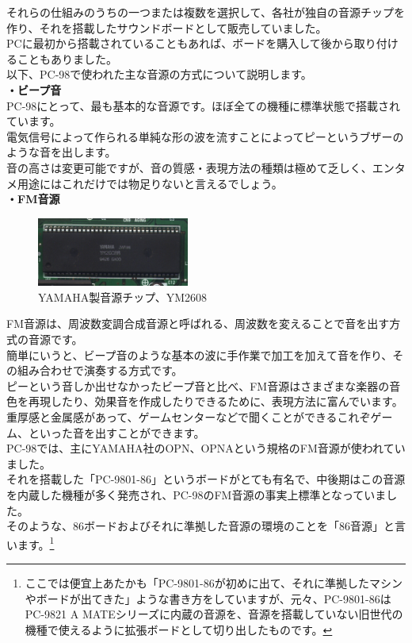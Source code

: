 \documentclass[b5paper,9pt,platex,dvipdfmx]{jsarticle}
\begin{document}
\begin{multicols}{3}
\begin{enumerate}
  それらの仕組みのうちの一つまたは複数を選択して、各社が独自の音源チップを作り、それを搭載したサウンドボードとして販売していました。\\
  PCに最初から搭載されていることもあれば、ボードを購入して後から取り付けることもありました。\\
  以下、PC-98で使われた主な音源の方式について説明します。\\
  {\bf ・ビープ音\\}
  PC-98にとって、最も基本的な音源です。ほぼ全ての機種に標準状態で搭載されています。\\
  電気信号によって作られる単純な形の波を流すことによってピーというブザーのような音を出します。\\
  音の高さは変更可能ですが、音の質感・表現方法の種類は極めて乏しく、エンタメ用途にはこれだけでは物足りないと言えるでしょう。\\
  {\bf ・FM音源 \\}
  \begin{figure}[H]
    \centering
    \includegraphics[width=5cm]{img-4.jpg}
    \caption{YAMAHA製音源チップ、YM2608}
  \end{figure}
  FM音源は、周波数変調合成音源と呼ばれる、周波数を変えることで音を出す方式の音源です。\\
  簡単にいうと、ビープ音のような基本の波に手作業で加工を加えて音を作り、その組み合わせで演奏する方式です。\\
  ピーという音しか出せなかったビープ音と比べ、FM音源はさまざまな楽器の音色を再現したり、効果音を作成したりできるために、表現方法に富んでいます。\\
  重厚感と金属感があって、ゲームセンターなどで聞くことができるこれぞゲーム、といった音を出すことができます。\\
  PC-98では、主にYAMAHA社のOPN、OPNAという規格のFM音源が使われていました。\\
  それを搭載した「PC-9801-86」というボードがとても有名で、中後期はこの音源を内蔵した機種が多く発売され、PC-98のFM音源の事実上標準となっていました。\\
  そのような、86ボードおよびそれに準拠した音源の環境のことを「86音源」と言います。\footnote{ここでは便宜上あたかも「PC-9801-86が初めに出て、それに準拠したマシンやボードが出てきた」ような書き方をしていますが、元々、PC-9801-86はPC-9821 A MATEシリーズに内蔵の音源を、音源を搭載していない旧世代の機種で使えるように拡張ボードとして切り出したものです。}\\

\end{enumerate}
\end{multicols}
\end{document}
